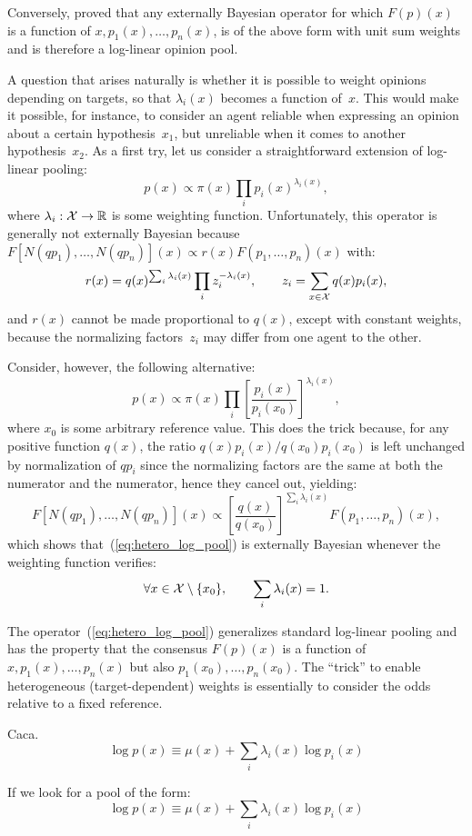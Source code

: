 \documentclass[english]{scrartcl}
\begin{document}
Conversely, \cite{Genest-86b} proved that any externally Bayesian operator for which $F(p)(x)$ is a function of $x,p_1(x),\ldots,p_n(x)$, is of the above form with unit sum weights and is therefore a log-linear opinion pool. 

A question that arises naturally is whether it is possible to weight opinions depending on targets, so that $\lambda_i(x)$ becomes a function of~$x$. This would make it possible, for instance, to consider an agent reliable when expressing an opinion about a certain hypothesis~$x_1$, but unreliable when it comes to another hypothesis~$x_2$. As a first try, let us consider a straightforward extension of log-linear pooling:
$$
p(x)\propto \pi(x) \prod_i p_i(x)^{\lambda_i(x)},
$$
where $\lambda_i : {\cal X}\to\mathbb{R}$ is some weighting function. Unfortunately, this operator is generally not externally Bayesian because $F[N(q p_1), \ldots, N(q p_n)](x)
\propto r(x) F(p_1,\ldots, p_n)(x)$ with:
$$
r(x) = q(x)^{\sum_i \lambda_i(x)} \prod_i z_i^{-\lambda_i(x)},
\qquad 
z_i = \sum_{x\in{\cal X}} q(x) p_i(x),
$$
and $r(x)$ cannot be made proportional to $q(x)$, except with constant weights, because the normalizing factors~$z_i$ may differ from one agent to the other.

Consider, however, the following alternative:
\begin{equation}
\label{eq:hetero_log_pool}
p(x) \propto \pi(x) \prod_i \left[\frac{p_i(x)}{p_i(x_0)}\right]^{\lambda_i(x)},    
\end{equation}
where $x_0$ is some arbitrary reference value. This does the trick because, for any positive function $q(x)$, the ratio $q(x)p_i(x)/q(x_0)p_i(x_0)$ is left unchanged by normalization of $q p_i$ since the normalizing factors are the same at both the numerator and the numerator, hence they cancel out, yielding:
$$
F[N(q p_1), \ldots, N(q p_n)](x)
\propto
\left[\frac{q(x)}{q(x_0)}\right]^{\sum_i \lambda_i(x)}
F(p_1, \ldots, p_n)(x),
$$
which shows that~(\ref{eq:hetero_log_pool}) is externally Bayesian whenever the weighting function verifies:
$$
\forall x \in {\cal X}\setminus \{x_0\},
\qquad
\sum_i \lambda_i(x) = 1.
$$

The operator~(\ref{eq:hetero_log_pool}) generalizes standard log-linear pooling and has the property that the consensus $F(p)(x)$ is a function of $x,p_1(x),\ldots,p_n(x)$ but also $p_1(x_0),\ldots,p_n(x_0)$. The ``trick'' to enable heterogeneous (target-dependent) weights is essentially to consider the odds relative to a fixed reference.

Caca.
$$
\log p(x) \equiv \mu(x) + \sum_i \lambda_i(x) \log p_i(x)
$$

If we look for a pool of the form:
$$
\log p(x) \equiv \mu(x) + \sum_i \lambda_i(x) \log p_i(x)
$$






%



\end{document}
